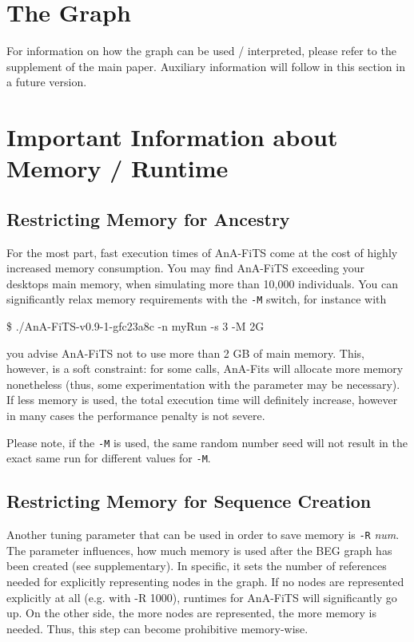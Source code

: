 \documentclass{scrartcl}
\begin{document}
\section{The Graph}
\label{sec:graph}

For information on how the graph can be used / interpreted, please
refer to the supplement of the main paper. Auxiliary information will
follow in this section in a future version.


\section{Important Information about Memory  / Runtime }
\label{sec:some-notes-runtime}

\subsection{Restricting Memory for Ancestry  }
\label{sec:restr-memory-ancestr}
For the most part, fast execution times of AnA-FiTS come at the cost
of highly increased memory consumption. You may find AnA-FiTS
exceeding your desktops main memory, when simulating more than 10,000
individuals. You can significantly relax memory requirements with
the \texttt{-M} switch, for instance with 

\$ ./AnA-FiTS-v0.9-1-gfc23a8c -n myRun -s 3  -M 2G 

you advise AnA-FiTS not to use more than 2 GB of main memory. This,
however, is a soft constraint: for some calls, AnA-Fits will allocate
more memory nonetheless (thus, some experimentation with the parameter
may be necessary). If less memory is used, the total execution time
will definitely increase, however in many cases the performance
penalty is not severe.

Please note, if the \texttt{-M} is used, the same random number seed
will not result in the exact same run for different values for
\texttt{-M}. 

\subsection{Restricting Memory for Sequence Creation}
\label{sec:restr-memory-sequ}

Another tuning parameter that can be used in order to save memory is
\texttt{-R} \textit{num}. The parameter influences, how much memory is
used after the BEG graph has been created (see supplementary). In
specific, it sets the number of references needed for explicitly
representing nodes in the graph. If no nodes are represented
explicitly at all (e.g. with -R 1000), runtimes for AnA-FiTS will
significantly go up. On the other side, the more nodes are
represented, the more memory is needed. Thus, this step can become
prohibitive memory-wise. 
\end{document}

